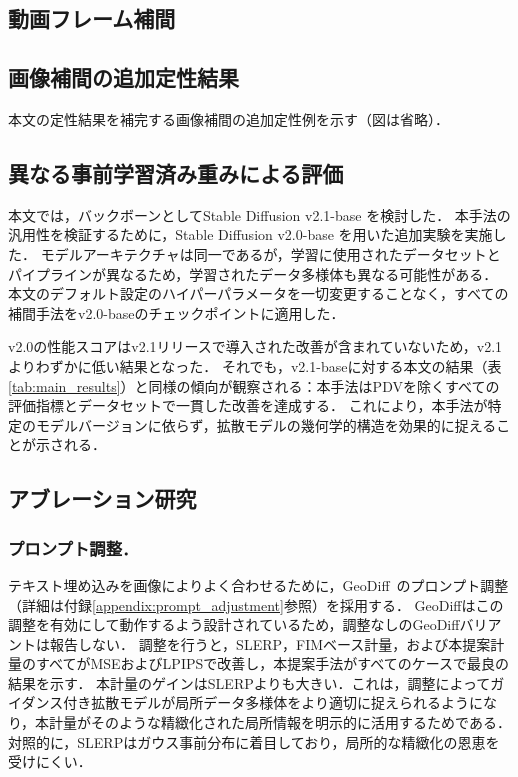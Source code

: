 \documentclass[MIRU,submit]{miru2026j}
\theoremstyle{definition}
\begin{document}
\subsection{動画フレーム補間}

\subsection{画像補間の追加定性結果}
本文の定性結果を補完する画像補間の追加定性例を示す（図は省略）．

\subsection{異なる事前学習済み重みによる評価}
本文では，バックボーンとしてStable Diffusion v2.1-base \cite{Rombach2022}を検討した．
本手法の汎用性を検証するために，Stable Diffusion v2.0-base \cite{Rombach2022}を用いた追加実験を実施した．
モデルアーキテクチャは同一であるが，学習に使用されたデータセットとパイプラインが異なるため，学習されたデータ多様体も異なる可能性がある．
本文のデフォルト設定のハイパーパラメータを一切変更することなく，すべての補間手法をv2.0-baseのチェックポイントに適用した．

v2.0の性能スコアはv2.1リリースで導入された改善が含まれていないため，v2.1よりわずかに低い結果となった．
それでも，v2.1-baseに対する本文の結果（表\ref{tab:main_results}）と同様の傾向が観察される：本手法はPDVを除くすべての評価指標とデータセットで一貫した改善を達成する．
これにより，本手法が特定のモデルバージョンに依らず，拡散モデルの幾何学的構造を効果的に捉えることが示される．

\subsection{アブレーション研究}\label{appendix:ablation}

\subsubsection{プロンプト調整．}
テキスト埋め込みを画像によりよく合わせるために，GeoDiff~\cite{Yu2025}のプロンプト調整（詳細は付録\ref{appendix:prompt_adjustment}参照）を採用する．
GeoDiffはこの調整を有効にして動作するよう設計されているため，調整なしのGeoDiffバリアントは報告しない．
調整を行うと，SLERP，FIMベース計量，および本提案計量のすべてがMSEおよびLPIPSで改善し，本提案手法がすべてのケースで最良の結果を示す．
本計量のゲインはSLERPよりも大きい．これは，調整によってガイダンス付き拡散モデルが局所データ多様体をより適切に捉えられるようになり，本計量がそのような精緻化された局所情報を明示的に活用するためである．
対照的に，SLERPはガウス事前分布に着目しており，局所的な精緻化の恩恵を受けにくい．
\end{document}
